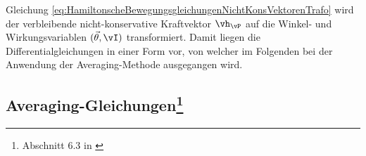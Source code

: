 Gleichung \eqref{eq:HamiltonscheBewegungsgleichungenNichtKonsVektorenTrafo} wird der verbleibende nicht-konservative Kraftvektor $\vh_{\vP}$
auf die Winkel- und Wirkungsvariablen $(\vec{\theta},\vI)$ transformiert.
Damit liegen die Differentialgleichungen in einer Form vor, von welcher im Folgenden bei der Anwendung der Averaging-Methode ausgegangen wird.




























%
%
%
%
%
\subsection[Averaging-Gleichungen]
		{Averaging-Gleichungen\footnote{Abschnitt 6.3 in \cite{Mayet:Tautochronic}}} 
		
